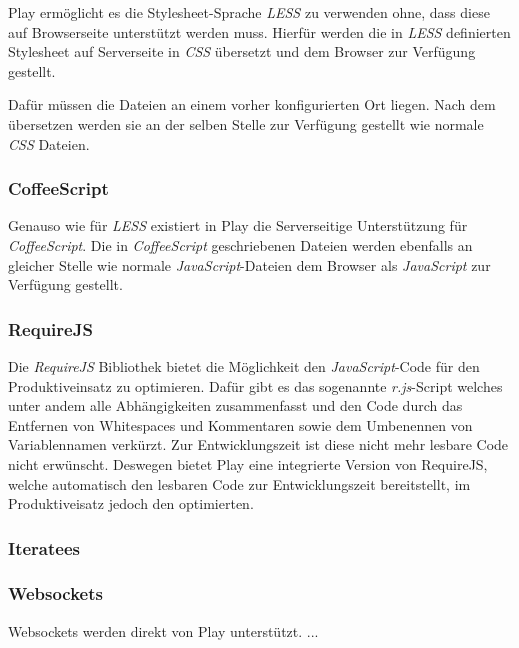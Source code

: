 Play ermöglicht es die Stylesheet-Sprache \textit{LESS} zu verwenden ohne, 
dass diese auf Browserseite unterstützt werden muss. Hierfür werden die in 
\textit{LESS} definierten Stylesheet auf Serverseite in \textit{CSS} übersetzt 
und dem Browser zur Verfügung gestellt.

Dafür müssen die Dateien an einem vorher konfigurierten Ort liegen. Nach dem 
übersetzen werden sie an der selben Stelle zur Verfügung gestellt wie normale 
\textit{CSS} Dateien.

\subsubsection{CoffeeScript}

Genauso wie für \textit{LESS} existiert in Play die Serverseitige Unterstützung 
für \textit{CoffeeScript}. Die in \textit{CoffeeScript} geschriebenen Dateien 
werden ebenfalls an gleicher Stelle wie normale \textit{JavaScript}-Dateien dem 
Browser als \textit{JavaScript} zur Verfügung gestellt.

\subsubsection{RequireJS}

Die \textit{RequireJS} Bibliothek bietet die Möglichkeit den 
\textit{JavaScript}-Code für den Produktiveinsatz zu optimieren. Dafür gibt es 
das sogenannte \textit{r.js}-Script welches unter andem alle Abhängigkeiten 
zusammenfasst und den Code durch das Entfernen von Whitespaces und Kommentaren 
sowie dem Umbenennen von Variablennamen verkürzt. Zur Entwicklungszeit ist diese 
nicht mehr lesbare Code nicht erwünscht. Deswegen bietet Play eine integrierte 
Version von RequireJS, welche automatisch den lesbaren Code zur Entwicklungszeit 
bereitstellt, im Produktiveisatz jedoch den optimierten.

\subsubsection{Iteratees}

\subsubsection{Websockets}

Websockets werden direkt von Play unterstützt. ...
